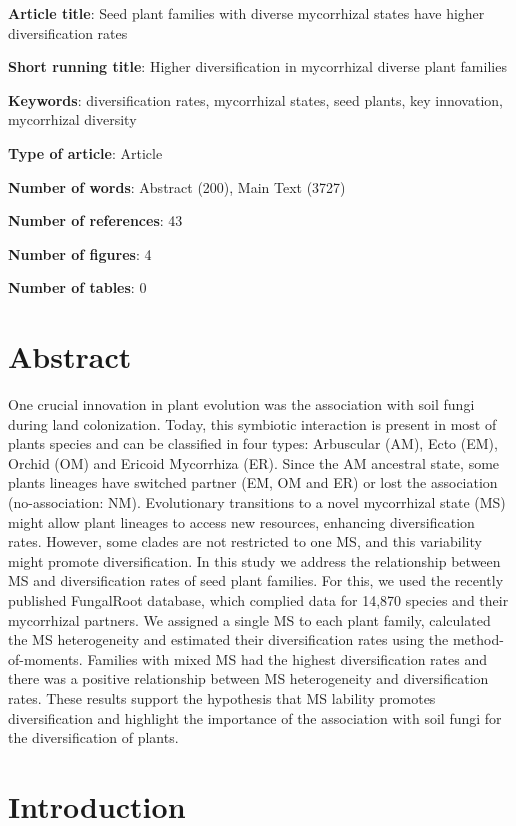 \documentclass[
  12pt,
]{article}
\date{}
\begin{document}
\textbf{Article title}: Seed plant families with diverse mycorrhizal
states have higher diversification rates

\textbf{Short running title}: Higher diversification in mycorrhizal
diverse plant families

\textbf{Keywords}: diversification rates, mycorrhizal states, seed
plants, key innovation, mycorrhizal diversity

\textbf{Type of article}: Article

\textbf{Number of words}: Abstract (200), Main Text (3727)

\textbf{Number of references}: 43

\textbf{Number of figures}: 4

\textbf{Number of tables}: 0

\pagebreak

\hypertarget{abstract}{%
\section{Abstract}\label{abstract}}

One crucial innovation in plant evolution was the association with soil
fungi during land colonization. Today, this symbiotic interaction is
present in most of plants species and can be classified in four types:
Arbuscular (AM), Ecto (EM), Orchid (OM) and Ericoid Mycorrhiza (ER).
Since the AM ancestral state, some plants lineages have switched partner
(EM, OM and ER) or lost the association (no-association: NM).
Evolutionary transitions to a novel mycorrhizal state (MS) might allow
plant lineages to access new resources, enhancing diversification rates.
However, some clades are not restricted to one MS, and this variability
might promote diversification. In this study we address the relationship
between MS and diversification rates of seed plant families. For this,
we used the recently published FungalRoot database, which complied data
for 14,870 species and their mycorrhizal partners. We assigned a single
MS to each plant family, calculated the MS heterogeneity and estimated
their diversification rates using the method-of-moments. Families with
mixed MS had the highest diversification rates and there was a positive
relationship between MS heterogeneity and diversification rates. These
results support the hypothesis that MS lability promotes diversification
and highlight the importance of the association with soil fungi for the
diversification of plants.

\hypertarget{introduction}{%
\section{Introduction}\label{introduction}}
\end{document}
